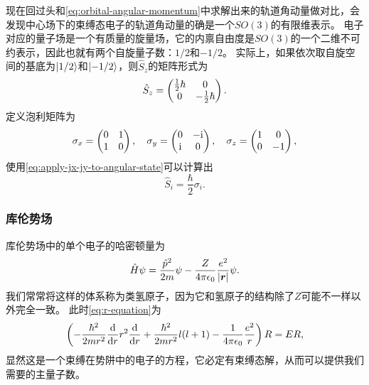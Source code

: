 \documentclass[UTF8, a4paper]{ctexart}
\newcommand*{\ii}{\mathrm{i}}
\begin{document}
现在回过头和\eqref{eq:orbital-angular-momentum}中求解出来的轨道角动量做对比，会发现中心场下的束缚态电子的轨道角动量的确是一个$SO(3)$的有限维表示。
电子对应的量子场是一个有质量的旋量场，它的内禀自由度是$SO(3)$的一个二维不可约表示，因此也就有两个自旋量子数：$1/2$和$-1/2$。
实际上，如果依次取自旋空间的基底为$\ket{1/2}$和$\ket{-1/2}$，则$\hat{S}_z$的矩阵形式为
\[
    \hat{S}_z = \pmqty{\frac{1}{2} \hbar & 0 \\ 0 & -\frac{1}{2} \hbar}.
\]
定义泡利矩阵为
\begin{equation}
    \sigma_x = \pmqty{0 & 1 \\ 1 & 0}, \quad \sigma_y = \pmqty{0 & -\ii \\ \ii & 0}, \quad \sigma_z = \pmqty{1 & 0 \\ 0 & -1},
\end{equation}
使用\eqref{eq:apply-jx-jy-to-angular-state}可以计算出
\begin{equation}
    \hat{S}_i = \frac{\hbar}{2} \sigma_i.
\end{equation}

\subsubsection{库伦势场}

库伦势场中的单个电子的哈密顿量为
\begin{equation}
    \hat{H} \psi = \frac{\hat{p}^2}{2m} \psi - \frac{Z}{4\pi \epsilon_0} \frac{e^2}{\abs{\vb*{r}}} \psi.
    \label{eq:columb-electron-hamiltonian}
\end{equation}
我们常常将这样的体系称为类氢原子，因为它和氢原子的结构除了$Z$可能不一样以外完全一致。
此时\eqref{eq:r-equation}为
\[
    \left( - \frac{\hbar^2}{2m r^2} \dv{r} r^2 \dv{r} + \frac{\hbar^2}{2m r^2} l(l+1) - \frac{1}{4\pi \epsilon_0} \frac{e^2}{r} \right) R = E R,
\]
显然这是一个束缚在势阱中的电子的方程，它必定有束缚态解，从而可以提供我们需要的主量子数。
\end{document}
